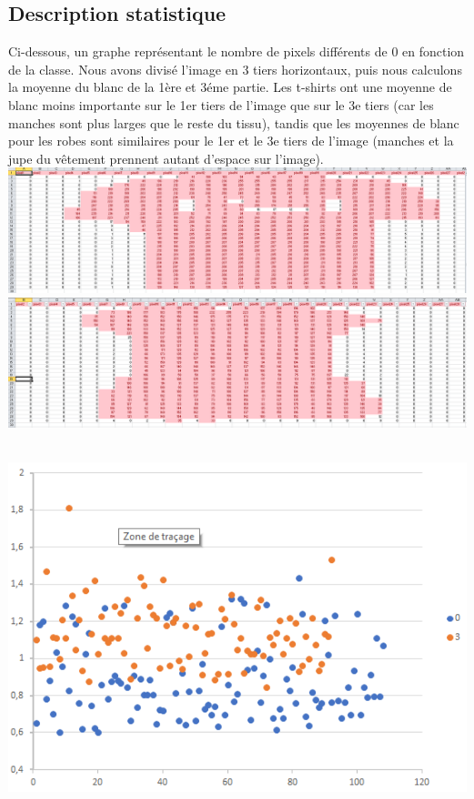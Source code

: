 \documentclass[a4paper,11pt]{article}
\begin{document}
	\subsection{Description statistique}
		Ci-dessous, un graphe représentant le nombre de pixels différents de 0 en fonction de la classe.
		Nous avons divisé l’image en 3 tiers horizontaux, puis nous calculons la moyenne du blanc de la 1ère et 3éme partie. Les t-shirts ont une moyenne de blanc moins importante sur le 1er tiers de l'image que sur le 3e tiers (car les manches sont plus larges que le reste du tissu), tandis que les moyennes de blanc pour les robes sont similaires pour le 1er et le 3e tiers de l'image (manches et la jupe du vêtement prennent autant d'espace sur l'image).\\
		\includegraphics[scale = 0.25]{fichiers/ex_tshirt.PNG}
		\includegraphics[scale = 0.25]{fichiers/ex_robe.PNG}\\
		\\
		\vfill\begin{center} \includegraphics[scale = 0.6]{fichiers/rapport.PNG} \end{center}\vfill
		
\end{document}
